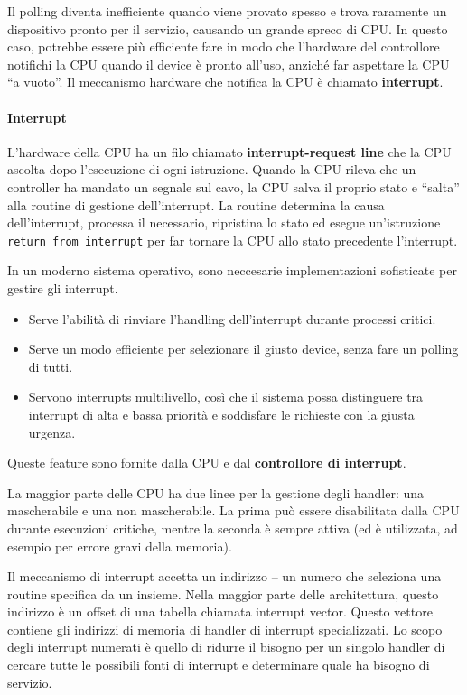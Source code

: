\documentclass[a4paper]{article}
\begin{document}
Il polling diventa inefficiente quando viene provato spesso e trova raramente un dispositivo pronto per il servizio, causando un grande spreco di CPU. In questo caso, potrebbe essere più efficiente fare in modo che l'hardware del controllore notifichi la CPU quando il device è pronto all'uso, anziché far aspettare la CPU ``a vuoto''. Il meccanismo hardware che notifica la CPU è chiamato \textbf{interrupt}.

\paragraph{Interrupt}
L'hardware della CPU ha un filo chiamato \textbf{interrupt-request line} che la CPU ascolta dopo l'esecuzione di ogni istruzione. Quando la CPU rileva che un controller ha mandato un segnale sul cavo, la CPU salva il proprio stato e ``salta'' alla routine di gestione dell'interrupt. La routine determina la causa dell'interrupt, processa il necessario, ripristina lo stato ed esegue un'istruzione \texttt{return from interrupt} per far tornare la CPU allo stato precedente l'interrupt.

In un moderno sistema operativo, sono neccesarie implementazioni sofisticate per gestire gli interrupt.
\begin{itemize}
    \item Serve l'abilità di rinviare l'handling dell'interrupt durante processi critici.
    \item Serve un modo efficiente per selezionare il giusto device, senza fare un polling di tutti.
    \item Servono interrupts multilivello, così che il sistema possa distinguere tra interrupt di alta e bassa priorità e soddisfare le richieste con la giusta urgenza.
\end{itemize}

Queste feature sono fornite dalla CPU e dal \textbf{controllore di interrupt}.

La maggior parte delle CPU ha due linee per la gestione degli handler: una mascherabile e una non mascherabile. La prima può essere disabilitata dalla CPU durante esecuzioni critiche, mentre la seconda è sempre attiva (ed è utilizzata, ad esempio per errore gravi della memoria).

Il meccanismo di interrupt accetta un indirizzo -- un numero che seleziona una routine specifica da un insieme. Nella maggior parte delle architettura, questo indirizzo è un offset di una tabella chiamata interrupt vector. Questo vettore contiene gli indirizzi di memoria di handler di interrupt specializzati. Lo scopo degli interrupt numerati è quello di ridurre il bisogno per un singolo handler di cercare tutte le possibili fonti di interrupt e determinare quale ha bisogno di servizio.
\end{document}

